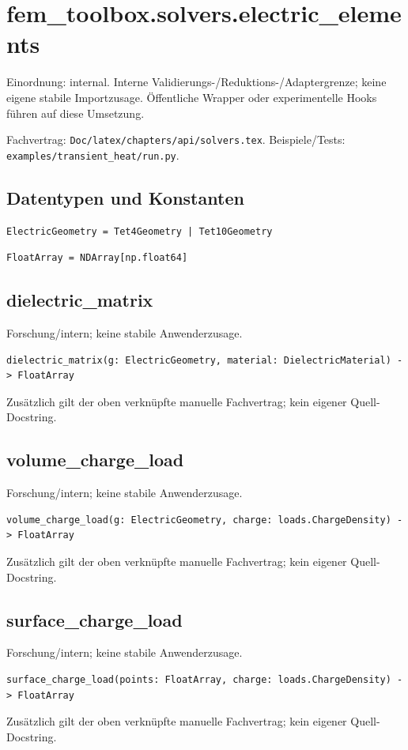 \section{fem\_toolbox.solvers.electric\_elements}
Einordnung: internal. Interne Validierungs-/Reduktions-/Adaptergrenze; keine eigene stabile Importzusage. Öffentliche Wrapper oder experimentelle Hooks führen auf diese Umsetzung.
\par Fachvertrag: \nolinkurl{Doc/latex/chapters/api/solvers.tex}. Beispiele/Tests:
\nolinkurl{examples/transient_heat/run.py}.
\subsection*{Datentypen und Konstanten}
\begin{lstlisting}
ElectricGeometry = Tet4Geometry | Tet10Geometry
\end{lstlisting}
\begin{lstlisting}
FloatArray = NDArray[np.float64]
\end{lstlisting}
\subsection{dielectric\_matrix}
Forschung/intern; keine stabile Anwenderzusage.
\begin{lstlisting}
dielectric_matrix(g: ElectricGeometry, material: DielectricMaterial) -> FloatArray
\end{lstlisting}
Zusätzlich gilt der oben verknüpfte manuelle Fachvertrag; kein eigener Quell-Docstring.
\subsection{volume\_charge\_load}
Forschung/intern; keine stabile Anwenderzusage.
\begin{lstlisting}
volume_charge_load(g: ElectricGeometry, charge: loads.ChargeDensity) -> FloatArray
\end{lstlisting}
Zusätzlich gilt der oben verknüpfte manuelle Fachvertrag; kein eigener Quell-Docstring.
\subsection{surface\_charge\_load}
Forschung/intern; keine stabile Anwenderzusage.
\begin{lstlisting}
surface_charge_load(points: FloatArray, charge: loads.ChargeDensity) -> FloatArray
\end{lstlisting}
Zusätzlich gilt der oben verknüpfte manuelle Fachvertrag; kein eigener Quell-Docstring.

